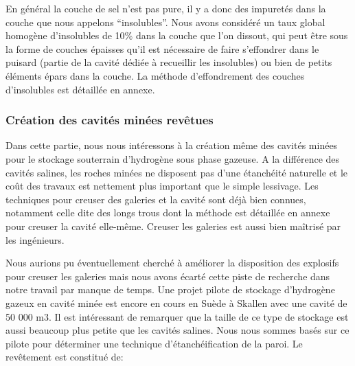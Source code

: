 \documentclass[11pt,french,a4paper]{article}
\begin{document}
En général la couche de sel n’est pas pure, il y a donc des impuretés dans la couche que nous appelons “insolubles”. Nous avons considéré un taux global homogène d’insolubles de 10\% dans la couche que l’on dissout, qui peut être sous la forme de couches épaisses qu’il est nécessaire de faire s’effondrer dans le puisard (partie de la cavité dédiée à recueillir les insolubles) ou bien de petits éléments épars dans la couche. La méthode d’effondrement des couches d’insolubles est détaillée en annexe.


\subsubsection{Création des cavités minées revêtues}

Dans cette partie, nous nous intéressons à la création même des cavités minées pour le stockage souterrain d’hydrogène sous phase gazeuse. A la différence des cavités salines, les roches minées ne disposent pas d’une étanchéité naturelle et le coût des travaux est nettement plus important que le simple lessivage. Les techniques pour creuser des galeries et la cavité sont déjà bien connues, notamment celle dite des longs trous dont la méthode est détaillée en annexe pour creuser la cavité elle-même. Creuser les galeries est aussi bien maîtrisé par les ingénieurs.

Nous aurions pu éventuellement cherché à améliorer la disposition des explosifs pour creuser les galeries mais nous avons écarté cette piste de recherche dans notre travail par manque de temps.
Une projet pilote de stockage d’hydrogène gazeux en cavité minée est encore en cours en Suède à Skallen avec une cavité de 50 000 m3. Il est intéressant de remarquer que la taille de ce type de stockage est aussi beaucoup plus petite que les cavités salines. Nous nous sommes basés sur ce pilote pour déterminer une technique d'étanchéification de la paroi.
Le revêtement est constitué de:
\end{document}
